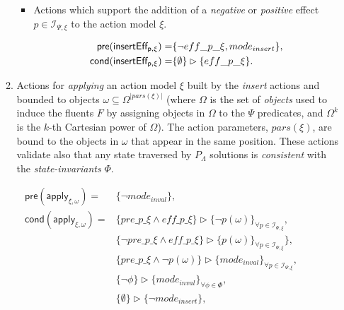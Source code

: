 \documentclass{article}
\newcommand{\pre}{\mathsf{pre}}     %
\newcommand{\cond}{\mathsf{cond}}   %
\begin{document}
\begin{itemize}
\begin{enumerate}
\begin{itemize}
\item Actions which support the addition of a {\em negative} or {\em positive} effect $p\in {\mathcal I}_{\Psi,\xi}$ to the action model $\xi$. 

\begin{small}
\begin{align*}
\hspace*{7pt}\pre(\mathsf{insertEff_{p,\xi}})=&\{\neg eff\_p\_\xi, mode_{insert}\},\\
\cond(\mathsf{insertEff_{p,\xi}})=&\{\emptyset\}\rhd\{eff\_p\_\xi\}.
\end{align*}
\end{small}
\end{itemize}

\item Actions for {\em applying} an action model $\xi$ built by the {\em insert} actions and bounded to objects $\omega\subseteq\Omega^{|pars(\xi)|}$ (where $\Omega$ is the set of {\em objects} used to induce the fluents $F$ by assigning objects in $\Omega$ to the $\Psi$ predicates, and $\Omega^k$ is the $k$-th Cartesian power of $\Omega$). The action parameters, $pars(\xi)$, are bound to the objects in $\omega$ that appear in the same position. These actions validate also that any state traversed by $P_{\Lambda}$ solutions is {\em consistent} with the {\em state-invariants} $\Phi$.
\end{enumerate}
\end{itemize}

\begin{small}
\begin{align*}
\pre(\mathsf{apply_{\xi,\omega}})=&\{\neg mode_{inval}\},\\
\cond(\mathsf{apply_{\xi,\omega}})=&\{pre\_p\_\xi\wedge eff\_p\_\xi\}\rhd\{\neg p(\omega)\}_{\forall p\in{\mathcal I}_{\Psi,\xi}},\\
&\{\neg pre\_p\_\xi \wedge eff\_p\_\xi\}\rhd\{p(\omega)\}_{\forall p\in{\mathcal I}_{\Psi,\xi}}\},\\
&\{pre\_p\_\xi \wedge \neg p(\omega)\}\rhd\{mode_{inval}\}_{\forall p\in{\mathcal I}_{\Psi,\xi}},\\
&\{\neg\phi\}\rhd\{mode_{inval}\}_{\forall \phi\in\Phi},\\
&\{\emptyset\}\rhd\{\neg mode_{insert}\},
\end{align*}
\end{small}
\end{document}
